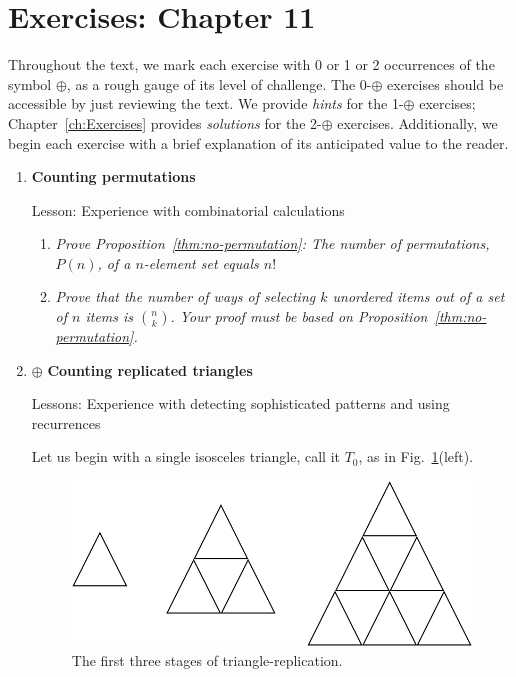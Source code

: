 \section{Exercises: Chapter 11}

Throughout the text, we mark each exercise with 0 or 1 or 2 occurrences of the symbol $\oplus$, as a rough gauge of its level of challenge.  The 0-$\oplus$ exercises should be accessible by just reviewing the text.  We provide {\em hints} for the 1-$\oplus$ exercises; Chapter~\ref{ch:Exercises} provides {\em solutions} for the 2-$\oplus$ exercises.  Additionally, we begin each exercise with a brief explanation of its anticipated value to the reader.

\begin{enumerate}
\item
{\bf Counting permutations}

{\sc Lesson:} Experience with combinatorial calculations

  \begin{enumerate}
  \item
{\em Prove Proposition~\ref{thm:no-permutation}:
The number of permutations, $P(n)$, of a $n$-element set equals $n!$}

  \medskip\item
{\em Prove that the number of ways of selecting $k$ unordered items out of a set of $n$ items is $\displaystyle {n \choose k}$.  Your proof must be based on Proposition~\ref{thm:no-permutation}.}
  \end{enumerate}

\medskip\item
$\oplus$
{\bf Counting replicated triangles}

{\sc Lessons:} Experience with detecting sophisticated patterns and using recurrences

\smallskip

Let us begin with a single isosceles triangle, call it $T_0$, as in Fig.~\ref{fig:countingTriangles}(left).
\begin{figure}[h]
\begin{center}
        \includegraphics[scale=0.35]{FiguresArithmetic/CountingTriangles}
        \caption{The first three stages of triangle-replication.}
        \label{fig:countingTriangles}
\end{center}
\end{figure}


\end{enumerate}
